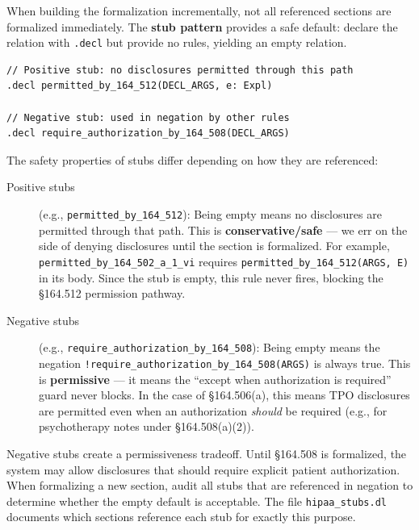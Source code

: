 \documentclass[11pt,letterpaper]{article}
\begin{document}
When building the formalization incrementally, not all referenced sections are formalized immediately. The \textbf{stub pattern} provides a safe default: declare the relation with \texttt{.decl} but provide no rules, yielding an empty relation.

\begin{lstlisting}[style=soufflestyle,caption={Stub declarations (from hipaa\_stubs.dl)}]
// Positive stub: no disclosures permitted through this path
.decl permitted_by_164_512(DECL_ARGS, e: Expl)

// Negative stub: used in negation by other rules
.decl require_authorization_by_164_508(DECL_ARGS)
\end{lstlisting}

The safety properties of stubs differ depending on how they are referenced:

\begin{description}
  \item[Positive stubs] (e.g., \texttt{permitted\_by\_164\_512}): Being empty means no disclosures are permitted through that path. This is \textbf{conservative/safe} --- we err on the side of denying disclosures until the section is formalized. For example, \texttt{permitted\_by\_164\_502\_a\_1\_vi} requires \texttt{permitted\_by\_164\_512(ARGS, E)} in its body. Since the stub is empty, this rule never fires, blocking the \S 164.512 permission pathway.

  \item[Negative stubs] (e.g., \texttt{require\_authorization\_by\_164\_508}): Being empty means the negation \texttt{!require\_authorization\_by\_164\_508(ARGS)} is always true. This is \textbf{permissive} --- it means the ``except when authorization is required'' guard never blocks. In the case of \S 164.506(a), this means TPO disclosures are permitted even when an authorization \emph{should} be required (e.g., for psychotherapy notes under \S 164.508(a)(2)).
\end{description}

\begin{warningbox}
Negative stubs create a permissiveness tradeoff. Until \S 164.508 is formalized, the system may allow disclosures that should require explicit patient authorization. When formalizing a new section, audit all stubs that are referenced in negation to determine whether the empty default is acceptable. The file \texttt{hipaa\_stubs.dl} documents which sections reference each stub for exactly this purpose.
\end{warningbox}
\end{document}

